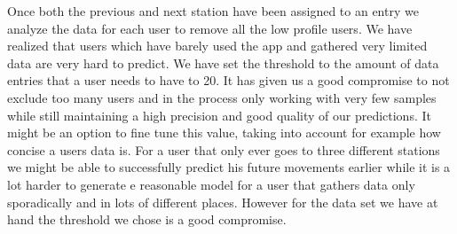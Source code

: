 Once both the previous and next station have been assigned to an entry we analyze the data for each user to remove all the low profile users. We have realized that users which have barely used the app and gathered very limited data are very hard to predict. We have set the threshold to the amount of data entries that a user needs to have to 20. It has given us a good compromise to not exclude too many users and in the process only working with very few samples while still maintaining a high precision and good quality of our predictions. It might be an option to fine tune this value, taking into account for example how concise a users data is. For a user that only ever goes to three different stations we might be able to successfully predict his future movements earlier while it is a lot harder to generate e reasonable model for a user that gathers data only sporadically and in lots of different places. However for the data set we have at hand the threshold we chose is a good compromise.


